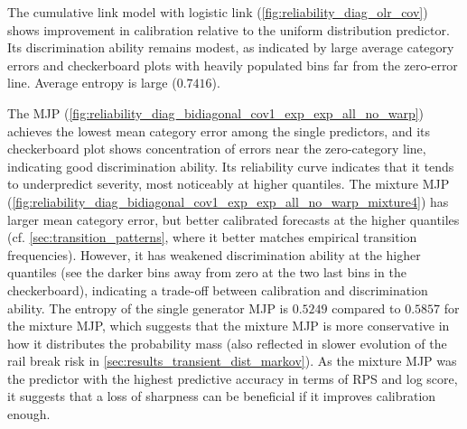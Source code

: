 \documentclass{article}
\begin{document}
The cumulative link model with logistic link (\cref{fig:reliability_diag_olr_cov}) shows improvement in calibration relative to the uniform distribution predictor.
Its discrimination ability remains modest, as indicated by large average category errors and checkerboard plots with heavily populated bins far from the zero-error line. Average entropy is large ($0.7416$).

The MJP (\cref{fig:reliability_diag_bidiagonal_cov1_exp_exp_all_no_warp}) achieves the lowest mean category error among the single predictors, and its checkerboard plot shows concentration of errors near the zero-category line, indicating good discrimination ability.
Its reliability curve indicates that it tends to underpredict severity, most noticeably at higher quantiles.
The mixture MJP (\cref{fig:reliability_diag_bidiagonal_cov1_exp_exp_all_no_warp_mixture4}) has larger mean category error, but better calibrated forecasts at the higher quantiles (cf. \cref{sec:transition_patterns}, where it better matches empirical transition frequencies). However, it has weakened discrimination ability at the higher quantiles (see the darker bins away from zero at the two last bins in the checkerboard), indicating a trade-off between calibration and discrimination ability.
The entropy of the single generator MJP is $0.5249$ compared to $0.5857$ for the mixture MJP, which suggests that the mixture MJP is more conservative in how it distributes the probability mass (also reflected in slower evolution of the rail break risk in \cref{sec:results_transient_dist_markov}). As the mixture MJP was the predictor with the highest predictive accuracy in terms of RPS and log score, it suggests that a loss of sharpness can be beneficial if it improves calibration enough.
\end{document}
